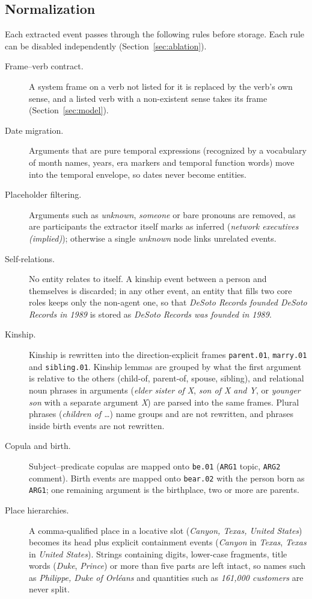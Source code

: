 \documentclass[preprint,12pt,authoryear]{elsarticle}
\begin{document}
\subsection{Normalization}

Each extracted event passes through the following rules before storage.
Each rule can be disabled independently (Section~\ref{sec:ablation}).

\begin{description}
\item[Frame--verb contract.] A system frame on a verb not listed for it is replaced by the verb's own sense, and a listed verb with a non-existent sense takes its frame (Section~\ref{sec:model}).
\item[Date migration.] Arguments that are pure temporal expressions (recognized by a vocabulary of month names, years, era markers and temporal function words) move into the temporal envelope, so dates never become entities.
\item[Placeholder filtering.] Arguments such as \textit{unknown}, \textit{someone} or bare pronouns are removed, as are participants the extractor itself marks as inferred (\textit{network executives (implied)}); otherwise a single \textit{unknown} node links unrelated events.
\item[Self-relations.] No entity relates to itself. A kinship event between a person and themselves is discarded; in any other event, an entity that fills two core roles keeps only the non-agent one, so that \textit{DeSoto Records founded DeSoto Records in 1989} is stored as \textit{DeSoto Records was founded in 1989}.
\item[Kinship.] Kinship is rewritten into the direction-explicit frames \texttt{parent.01}, \texttt{marry.01} and \texttt{sibling.01}. Kinship lemmas are grouped by what the first argument is relative to the others (child-of, parent-of, spouse, sibling), and relational noun phrases in arguments (\textit{elder sister of X}, \textit{son of X and Y}, or \textit{younger son} with a separate argument \textit{X}) are parsed into the same frames. Plural phrases (\textit{children of \ldots}) name groups and are not rewritten, and phrases inside birth events are not rewritten.
\item[Copula and birth.] Subject--predicate copulas are mapped onto \texttt{be.01} (\texttt{ARG1} topic, \texttt{ARG2} comment). Birth events are mapped onto \texttt{bear.02} with the person born as \texttt{ARG1}; one remaining argument is the birthplace, two or more are parents.
\item[Place hierarchies.] A comma-qualified place in a locative slot (\textit{Canyon, Texas, United States}) becomes its head plus explicit containment events (\textit{Canyon} in \textit{Texas}, \textit{Texas} in \textit{United States}). Strings containing digits, lower-case fragments, title words (\textit{Duke}, \textit{Prince}) or more than five parts are left intact, so names such as \textit{Philippe, Duke of Orl\'eans} and quantities such as \textit{161,000 customers} are never split.

\end{description}
\end{document}
